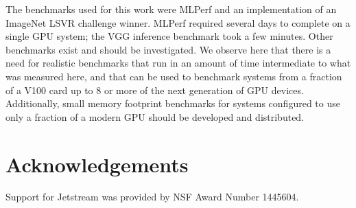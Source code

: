\documentclass[conference]{IEEEtran}
\begin{document}
The benchmarks used for this work were MLPerf and an implementation of an ImageNet LSVR challenge winner. MLPerf required several days to complete on a single GPU system; the VGG inference benchmark took a few minutes. Other benchmarks \cite{bench-design} exist and should be investigated. We observe here that there is a need for realistic benchmarks that run in an amount of time intermediate to what was measured here, and that can be used to benchmark systems from a fraction of a V100 card up to 8 or more of the next generation of GPU devices. Additionally, small memory footprint benchmarks for systems configured to use only a fraction of a modern GPU should be developed and distributed.

\section*{Acknowledgements}
Support for Jetstream was provided by NSF Award Number 1445604. 



\end{document}
